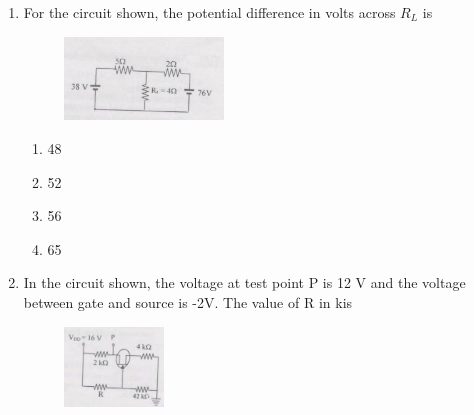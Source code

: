 \documentclass[journal,12pt,onecolumn]{IEEEtran}
\begin{document}
\begin{enumerate}[itemsep = 1em]
\begin{multicols}{4}
\begin{enumerate}
    \item 1001
    \item 0100
    \item 0110
    \item 1010
\end{enumerate} 
\end{multicols}


\item For the circuit shown, the potential difference in volts across $R_L$ is

\hfill{}

\begin{figure}[ht!]
    \centering
    \includegraphics[width=0.4\textwidth]{fig9.jpeg}
    \caption{}
    \label{fig:fig9.jpeg}
\end{figure}

\begin{multicols}{4}
\begin{enumerate}
    \item 48
    \item 52
    \item 56
    \item 65
\end{enumerate} 
\end{multicols}


\item In the circuit shown, the voltage at test point P is 12 V and the voltage between gate and source is -2V. The value of R in k\ohm is

\hfill{}

\begin{figure}[ht!]
    \centering
    \includegraphics[width=0.25\textwidth]{fig10.jpeg}
    \caption{}
    \label{fig:fig10.jpeg}
\end{figure}


\end{enumerate}
\end{document}
